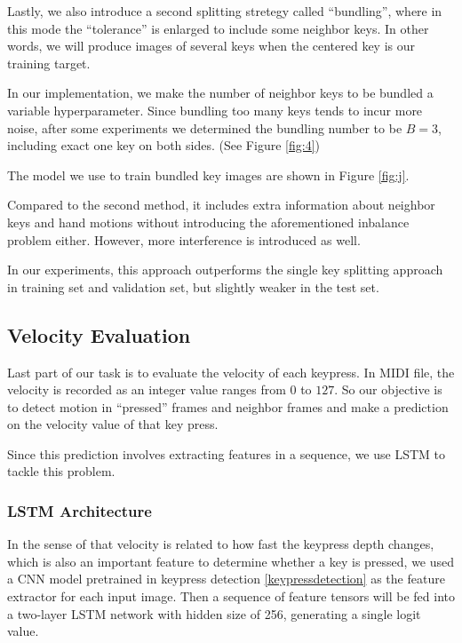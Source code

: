 \documentclass[10pt,twocolumn,letterpaper]{article}
\begin{document}
Lastly, we also introduce a second splitting stretegy called ``bundling'', where in this mode the ``tolerance'' is enlarged to include some neighbor keys.
In other words, we will produce images of several keys when the centered key is our training target. 

In our implementation, we make the number of neighbor keys to be bundled a variable hyperparameter. 
Since bundling too many keys tends to incur more noise, after some experiments we determined the bundling number to be $B = 3$, including exact one key on both sides. (See Figure \ref{fig:4})

The model we use to train bundled key images are shown in Figure \ref{fig:j}. 

Compared to the second method, it includes extra information about neighbor keys and hand motions without introducing the aforementioned inbalance problem either. However, more interference is introduced as well.

In our experiments, this approach outperforms the single key splitting approach in training set and validation set, but slightly weaker in the test set.

\subsection{Velocity Evaluation}

   Last part of our task is to evaluate the velocity of each keypress. 
   In MIDI file, the velocity is recorded as an integer value ranges from $0$ to $127$. 
   So our objective is to detect motion in ``pressed'' frames and neighbor frames and make a prediction on the velocity value of that key press.
   
   Since this prediction involves extracting features in a sequence, we use LSTM to tackle this problem. 
   
   \subsubsection{LSTM Architecture}

   In the sense of that velocity is related to how fast the keypress depth changes, which is also an important feature to determine whether a key is pressed, we used a CNN model pretrained in keypress detection \ref{keypressdetection} as the feature extractor for each input image. Then a sequence of feature tensors will be fed into a two-layer LSTM network with hidden size of 256, generating a single logit value.
   
\end{document}
